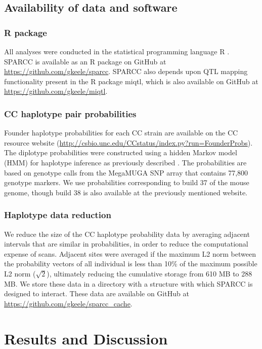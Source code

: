 \subsection{Availability of data and software}

\subsubsection{R package} 

All analyses were conducted in the statistical programming language R \citep{RSoftware2018}. SPARCC is available as an R package on GitHub at \url{https://github.com/gkeele/sparcc}. SPARCC also depends upon QTL mapping functionality present in the R package miqtl, which is also available on GitHub at \url{https://github.com/gkeele/miqtl}.

\subsubsection{CC haplotype pair probabilities}

Founder haplotype probabilities for each CC strain are available on the CC resource website (\url{http://csbio.unc.edu/CCstatus/index.py?run=FounderProbs}). The diplotype probabilities were constructed using a hidden Markov model (HMM) for haplotype inference as previously described \citep{Liu2010}. The probabilities are based on genotype calls from the MegaMUGA SNP array that contains 77,800 genotype markers. We use probabilities corresponding to build 37 of the mouse genome, though build 38 is also available at the previously mentioned website.

\subsubsection{Haplotype data reduction}

We reduce the size of the CC haplotype probability data by averaging adjacent intervals that are similar in probabilities, in order to reduce the computational expense of scans. Adjacent sites were averaged if the maximum L2 norm between the probability vectors of all individual is less than 10\% of the maximum possible L2 norm ($\sqrt{2}$), ultimately reducing the cumulative storage from 610 MB to 288 MB. We store these data in a directory with a structure with which SPARCC is designed to interact. These data are available on GitHub at \url{https://github.com/gkeele/sparcc_cache}.

\section{Results and Discussion}

